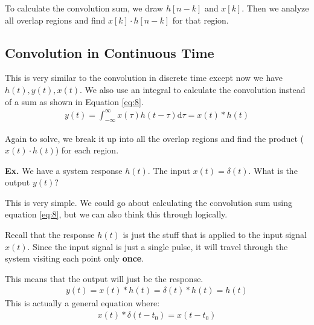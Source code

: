 \documentclass[12pt,letterpaper]{article} \usepackage{amsmath} \usepackage{graphicx} \usepackage[margin=1in]{geometry} \usepackage{longtable}  \usepackage{amssymb}
\begin{document}
	To calculate the convolution sum, we draw $h[n-k]$ and $x[k]$. Then we analyze all overlap regions and find $x[k]\cdot h[n-k]$ for that region. 
	
	\subsection{Convolution in Continuous Time}
	This is very similar to the convolution in discrete time except now we have $h(t), y(t), x(t)$. We also use an integral to calculate the convolution instead of a sum as shown in Equation \ref{eq:8}.
	\begin{align}
		y(t)=\int^{\infty}_{-\infty} x(\tau)h(t-\tau)\mathrm d\tau = x(t)*h(t)\label{eq:8}
	\end{align}
	
	Again to solve, we break it up into all the overlap regions and find the product ($x(t)\cdot h(t)$) for each region.
	
	\begin{mdframed}
		\textbf{Ex.} We have a system response $h(t)$. The input $x(t) = \delta(t)$. What is the output $y(t)$?
		
		This is very simple. We could go about calculating the convolution sum using equation \ref{eq:8}, but we can also think this through logically. 
		
		Recall that the response $h(t)$ is just the stuff that is applied to the input signal $x(t)$. Since the input signal is just a single pulse, it will travel through the system visiting each point only \textbf{once}. 
		
		This means that the output will just be the response. 
		\begin{align*}
			y(t) = x(t) * h(t) = \delta(t) * h(t) = h(t)
		\end{align*}
		This is actually a general equation where:
		\begin{align}
			x(t)*\delta(t-t_0) = x(t-t_0)
		\end{align}
	\end{mdframed}
	
\end{document}
